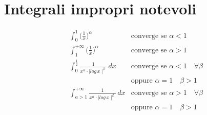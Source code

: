 \documentclass[a4paper,10pt,italian]{article}
\begin{document}
\newpage

\section{Integrali impropri notevoli}
\begin{align*}
&\int_{0}^{1} \Bigr( \frac{1}{x} \Bigr) ^\alpha & \mbox{converge se } \alpha < 1 \\
&\int_{1}^{+\infty} \Bigr( \frac{1}{x} \Bigr) ^\alpha & \mbox{converge se } \alpha > 1 \\
&\int_{0}^{\frac{1}{2}} \frac{1}{x^\alpha \cdot \mid log\,x \mid ^\beta}\,dx & \mbox{converge se } \alpha < 1 \quad \forall \beta \\
&& \mbox{oppure } \alpha = 1 \quad \beta > 1 \\
&\int_{a>1}^{+\infty} \frac{1}{x^\alpha \cdot \mid log\,x \mid ^\beta}\,dx & \mbox{converge se } \alpha > 1 \quad \forall \beta \\
&& \mbox{oppure } \alpha = 1 \quad \beta > 1 \\
\end{align*}



\end{document}
